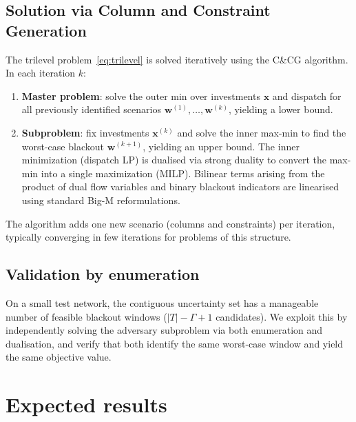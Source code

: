 \documentclass[11pt, a4paper]{article}
\begin{document}
\subsection{Solution via Column and Constraint Generation}

The trilevel problem~\eqref{eq:trilevel} is solved iteratively using the C\&CG algorithm. In each iteration $k$:
\begin{enumerate}[nosep]
  \item \textbf{Master problem}: solve the outer min over investments $\mathbf{x}$ and dispatch for all previously identified scenarios $\mathbf{w}^{(1)}, \dots, \mathbf{w}^{(k)}$, yielding a lower bound.
  \item \textbf{Subproblem}: fix investments $\mathbf{x}^{(k)}$ and solve the inner max-min to find the worst-case blackout $\mathbf{w}^{(k+1)}$, yielding an upper bound. The inner minimization (dispatch LP) is dualised via strong duality to convert the max-min into a single maximization (MILP). Bilinear terms arising from the product of dual flow variables and binary blackout indicators are linearised using standard Big-M reformulations.
\end{enumerate}

The algorithm adds one new scenario (columns and constraints) per iteration, typically converging in few iterations for problems of this structure.

\subsection{Validation by enumeration}

On a small test network, the contiguous uncertainty set has a manageable number of feasible blackout windows ($|T| - \Gamma + 1$ candidates). We exploit this by independently solving the adversary subproblem via both enumeration and dualisation, and verify that both identify the same worst-case window and yield the same objective value.

\section{Expected results}
\end{document}

